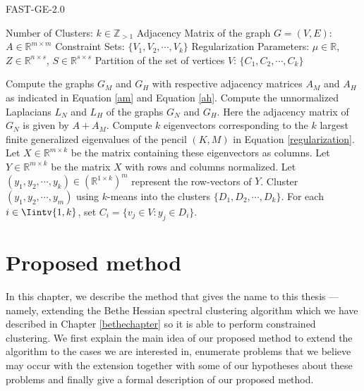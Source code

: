 \begin{algorithm}
\caption{FAST-GE-2.0}\label{fastge2alg}
\begin{algorithmic}[1]
   \INPUT
      \Statex Number of Clusters: $k \in \mathbb Z_{>1}$
      \Statex Adjacency Matrix of the graph $G=(V,E)$: $A \in \mathbb R ^ {m \times m}$ 
      \Statex Constraint Sets: $\{ V_1, V_2, \cdots, V_k \}$
      \Statex Regularization Parameters: $\mu \in \mathbb R$, $Z \in \mathbb R ^{n \times s}$, $S \in \mathbb R ^{s \times s}$
   \OUTPUT
      \Statex Partition of the set of vertices $V$: $\{ C_1, C_2, \cdots, C_k \} $
      \vspace{0.2 cm}

   \State Compute the graphs $G_M$ and $G_H$ with respective adjacency matrices $A_M$ and $A_H$ as indicated in Equation \vref{am} and Equation \vref{ah}.
   \State Compute the unnormalized Laplacians $L_N$ and $L_H$ of the graphs $G_N$ and $G_H$. Here the adjacency matrix of $G_N$ is given by $A + A_M$.
   \State Compute $k$ eigenvectors corresponding to the $k$ largest finite generalized eigenvalues of the pencil $(K,M)$ in Equation \vref{regularization}. Let $X \in \mathbb R ^{m \times k}$ be the matrix containing these eigenvectors as columns.
   \State Let $Y \in \mathbb R ^{m \times k}$ be the matrix $X$ with rows and columns normalized.
   \State Let $(y_1, y_2, \cdots, y_k) \in (\mathbb R^{1 \times k})^m$ represent the row-vectors of $Y$.
   \State Cluster $(y_1, y_2, \cdots, y_m)$ using $k$-means into the clusters $ \{ D_1, D_2, \cdots, D_k \}$.
   \State For each $i \in \Iintv{1,k}$, set $C_i = \{ v_j \in V: y_j \in D_i \}$.
\end{algorithmic}
\end{algorithm}



\chapter{Proposed method} \label{proposed_chapter}
In this chapter, we describe the method that gives the name to this thesis --- namely, extending the Bethe Hessian spectral clustering algorithm which we have described in Chapter \ref{bethechapter} so it is able to perform constrained clustering.
We first explain the main idea of our proposed method to extend the algorithm to the cases we are interested in, enumerate problems that we believe may occur with the extension together with some of our hypotheses about these problems and finally give a formal description of our proposed method.

